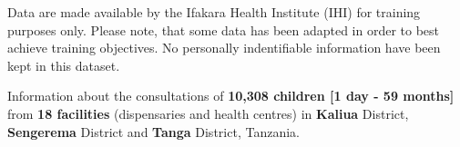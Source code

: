 \documentclass[
  letterpaper,
  DIV=11,
  numbers=noendperiod,
  oneside]{scrreprt}
\begin{document}
\begin{tcolorbox}[enhanced jigsaw, coltitle=black, opacityback=0, title=\textcolor{quarto-callout-important-color}{\faExclamation}\hspace{0.5em}{Important}, toprule=.15mm, bottomtitle=1mm, colbacktitle=quarto-callout-important-color!10!white, colframe=quarto-callout-important-color-frame, left=2mm, opacitybacktitle=0.6, bottomrule=.15mm, arc=.35mm, toptitle=1mm, colback=white, titlerule=0mm, breakable, leftrule=.75mm, rightrule=.15mm]

Data are made available by the Ifakara Health Institute (IHI) for
training purposes only. Please note, that some data has been adapted in
order to best achieve training objectives. No personally indentifiable
information have been kept in this dataset.

\end{tcolorbox}

Information about the consultations of \textbf{10,308 children {[}1 day
- 59 months{]}} from \textbf{18 facilities} (dispensaries and health
centres) in \textbf{Kaliua} District, \textbf{Sengerema} District and
\textbf{Tanga} District, Tanzania.
\end{document}
